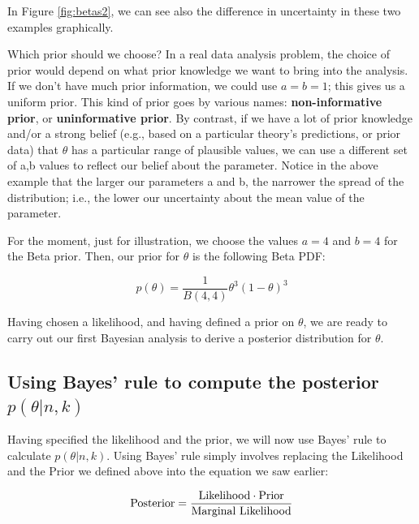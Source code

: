 \documentclass[12pt,]{krantz}
\theoremstyle{definition}
\theoremstyle{definition}
\theoremstyle{definition}
\theoremstyle{remark}
\begin{document}
In Figure \ref{fig:betas2}, we can see also the difference in uncertainty in these two examples graphically.

Which prior should we choose? In a real data analysis problem, the choice of prior would depend on what prior knowledge we want to bring into the analysis. If we don't have much prior information, we could use \(a=b=1\); this gives us a uniform prior. This kind of prior goes by various names: \textbf{non-informative prior}, or \textbf{uninformative prior}. By contrast, if we have a lot of prior knowledge and/or a strong belief (e.g., based on a particular theory's predictions, or prior data) that \(\theta\) has a particular range of plausible values, we can use a different set of a,b values to reflect our belief about the parameter. Notice in the above example that the larger our parameters a and b, the narrower the spread of the distribution; i.e., the lower our uncertainty about the mean value of the parameter.

For the moment, just for illustration, we choose the values \(a=4\) and \(b=4\) for the Beta prior. Then, our prior for \(\theta\) is the following Beta PDF:

\begin{equation}
p(\theta) = \frac{1}{B(4,4)} \theta^{3} (1-\theta)^{3}
\end{equation}

Having chosen a likelihood, and having defined a prior on \(\theta\), we are ready to carry out our first Bayesian analysis to derive a posterior distribution for \(\theta\).

\hypertarget{using-bayes-rule-to-compute-the-posterior-pthetank}{%
\subsection{\texorpdfstring{Using Bayes' rule to compute the posterior \(p(\theta|n,k)\)}{Using Bayes' rule to compute the posterior p(\textbackslash{}theta\textbar{}n,k)}}\label{using-bayes-rule-to-compute-the-posterior-pthetank}}

Having specified the likelihood and the prior, we will now use Bayes' rule to calculate \(p(\theta|n,k)\). Using Bayes' rule simply involves replacing the Likelihood and the Prior we defined above into the equation we saw earlier:

\begin{equation}
\hbox{Posterior} = \frac{\hbox{Likelihood} \cdot \hbox{Prior}}{\hbox{Marginal Likelihood}}
\end{equation}
\end{document}
